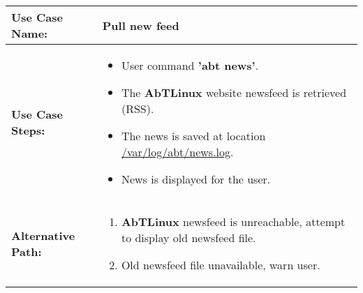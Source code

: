 \medskip

\begin{tabularx}{\linewidth}{|l|X|}
\hline
\textbf{Use Case Name:} & \textbf{Pull new feed} \\
\hline
\textbf{Use Case Steps:} & 
\begin{minipage}{\linewidth} 
  \vspace{0.05em}
  \begin{itemize}
    \item User command \textbf{'abt news'}.
    \item The \textbf{AbTLinux} website newsfeed is retrieved (RSS).
    \item The news is saved at location \url{/var/log/abt/news.log}.
    \item News is displayed for the user.
  \end{itemize}
  \vspace{0.05em}
\end{minipage}
\\
\hline 
\textbf{Alternative Path:} &
\begin{minipage}{\linewidth}
  \vspace{0.05em} 
  \begin{enumerate}
    \item \textbf{AbTLinux} newsfeed is unreachable, attempt to display old newsfeed file.
    \item Old newsfeed file unavailable, warn user.
  \end{enumerate}
  \vspace{0.05em} 
\end{minipage}
\\
\hline
\end{tabularx}